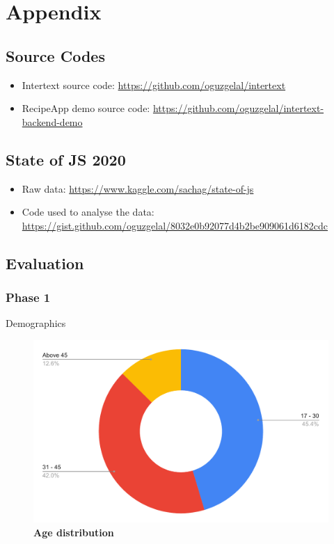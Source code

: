 \chapter{Appendix} \label{App:AppendixA}

\section{Source Codes}

\begin{itemize}
    \item Intertext source code: \url{https://github.com/oguzgelal/intertext}
    
    \item RecipeApp demo source code: \url{https://github.com/oguzgelal/intertext-backend-demo}
\end{itemize}

\section{State of JS 2020}

\begin{itemize}
    \item Raw data: \url{https://www.kaggle.com/sachag/state-of-js}
    \item Code used to analyse the data: \url{https://gist.github.com/oguzgelal/8032e0b92077d4b2be909061d6182cdc}
\end{itemize}


\section{Evaluation}

\subsection{Phase 1}

Demographics

\begin{figure}[H]
  \centering
  \includegraphics[width=13cm]{thesis/paper/images/p1_age.pdf}
  \textbf{Age distribution}
\end{figure}

